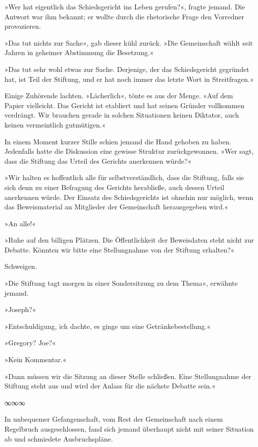 »Wer hat eigentlich das Schiedsgericht ins Leben gerufen?«, fragte jemand. Die Antwort war ihm bekannt; er wollte durch die rhetorische Frage den Vorredner provozieren.

»Das tut nichts zur Sache«, gab dieser kühl zurück. »Die Gemeinschaft wählt seit Jahren in geheimer Abstimmung die Besetzung.«

»Das tut sehr wohl etwas zur Sache. Derjenige, der das Schiedsgericht gegründet hat, ist Teil der Stiftung, und er hat noch immer das letzte Wort in Streitfragen.«

Einige Zuhörende lachten. »Lächerlich«, tönte es aus der Menge. »Auf dem Papier vielleicht. Das Gericht ist etabliert und hat seinen Gründer vollkommen verdrängt. Wir brauchen gerade in solchen Situationen keinen Diktator, auch keinen vermeintlich gutmütigen.«

In einem Moment kurzer Stille schien jemand die Hand gehoben zu haben. Jedenfalls hatte die Diskussion eine gewisse Struktur zurückgewonnen. »Wer sagt, dass die Stiftung das Urteil des Gerichts anerkennen würde?«

»Wir halten es hoffentlich alle für selbstverständlich, dass die Stiftung, falls sie sich denn zu einer Befragung des Gerichts herabließe, auch dessen Urteil anerkennen würde. Der Einsatz des Schiedsgerichts ist ohnehin nur möglich, wenn das Beweismaterial an Mitglieder der Gemeinschaft herausgegeben wird.«

»An alle!«

»Ruhe auf den billigen Plätzen. Die Öffentlichkeit der Beweisdaten steht nicht zur Debatte. Könnten wir bitte eine Stellungnahme von der Stiftung erhalten?«

Schweigen.

»Die Stiftung tagt morgen in einer Sondersitzung zu dem Thema«, erwähnte jemand.

»Joseph?«

»Entschuldigung, ich dachte, es ginge um eine Getränkebestellung.«

»Gregory? Joe?«

»Kein Kommentar.«

»Dann müssen wir die Sitzung an dieser Stelle schließen. Eine Stellungnahme der Stiftung steht aus und wird der Anlass für die nächste Debatte sein.«

\begin{center}
	∞∞∞
\end{center}

In unbequemer Gefangenschaft, vom Rest der Gemeinschaft nach einem Regelbruch ausgeschlossen, fand sich jemand überhaupt nicht mit seiner Situation ab und schmiedete Ausbruchspläne.

